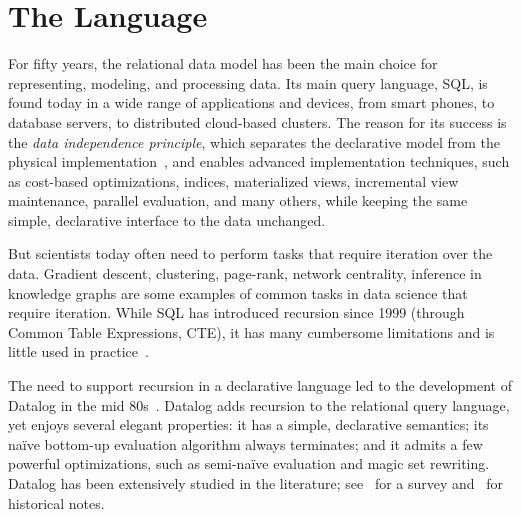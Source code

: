 \chapter{The \datalogo Language}
\label{chap:datalogo}


For fifty years, the relational data model has been the main choice for
representing, modeling, and processing data.  Its main query
language, SQL, is found today in a wide range of applications and
devices, from smart phones, to database servers, to distributed
cloud-based clusters.  The reason for its success is the {\em data
  independence principle}, which separates the declarative model from
the physical implementation~\cite{DBLP:journals/cacm/Codd70}, and
enables advanced implementation techniques, such as cost-based
optimizations, indices, materialized views, incremental view
maintenance, parallel evaluation, and many others, while keeping the
same simple, declarative interface to the data unchanged.

But scientists today often need to perform tasks that require
iteration over the data.
Gradient descent, clustering, page-rank, network centrality, inference
in knowledge graphs are some examples of common tasks in data science
that require iteration.  While SQL has introduced recursion since 1999
(through Common Table Expressions, CTE), it has many cumbersome
limitations and is little used in practice~\cite{frankmcsherry-2022}.

The need to support recursion in a declarative language led to the
development of Datalog in the mid 80s~\cite{DBLP:conf/pods/Vianu21}.
Datalog adds recursion to the relational query language, yet enjoys several elegant
properties: it has a simple, declarative semantics; its na\"ive
bottom-up evaluation algorithm always terminates; and it admits a few
powerful optimizations, such as semi-na\"ive evaluation and magic set
rewriting.  Datalog has been extensively studied in the literature;
see~\cite{DBLP:journals/ftdb/GreenHLZ13} for a survey
and~\cite{DBLP:books/mc/18/MaierTKW18,DBLP:conf/pods/Vianu21} for historical notes.

